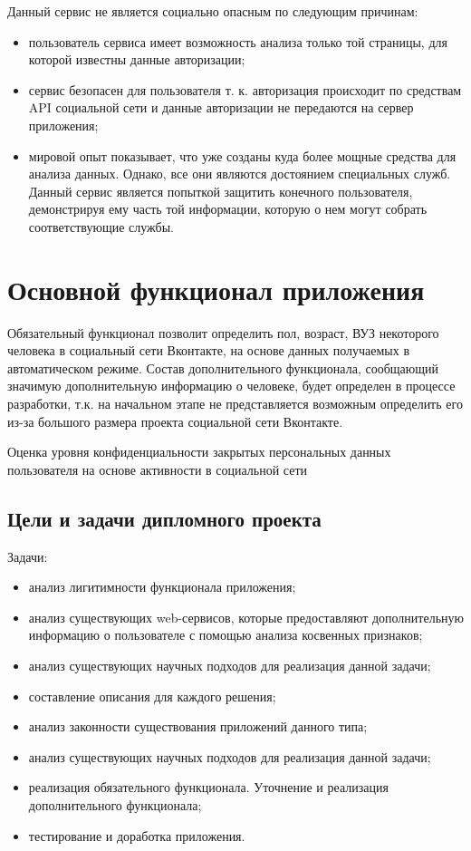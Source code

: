 \begin{chap1}
Данный сервис не является социально опасным по следующим причинам:
\begin{itemize}
\item пользователь сервиса имеет возможность анализа только той страницы, для которой известны данные авторизации;
\item сервис безопасен для пользователя т. к. авторизация происходит по средствам  API  социальной сети и данные авторизации не передаются на сервер приложения; 
\item мировой опыт показывает, что уже созданы куда более мощные средства для анализа данных. Однако, все они являются достоянием специальных служб. Данный сервис является попыткой защитить конечного пользователя, демонстрируя ему часть той информации, которую о нем могут собрать соответствующие службы.
\end{itemize}

\section{Основной функционал приложения}
Обязательный функционал позволит определить пол, возраст, ВУЗ некоторого человека в социальный сети Вконтакте, на основе данных получаемых в автоматическом режиме. Состав дополнительного функционала, сообщающий значимую дополнительную информацию о человеке,  будет определен в процессе разработки, т.к. на начальном этапе не представляется возможным определить его из-за большого размера проекта социальной сети Вконтакте.

Оценка уровня конфиденциальности закрытых персональных данных пользователя на основе активности в социальной сети

\subsection{Цели и задачи дипломного проекта}
Задачи:
	\begin{itemize}
\item анализ лигитимности функционала приложения;
\item анализ существующих web-сервисов, которые предоставляют дополнительную информацию о пользователе с помощью анализа косвенных признаков;
\item анализ существующих научных подходов для реализация данной задачи;
\item составление описания для каждого решения;
\item анализ законности существования приложений данного типа;
\item анализ существующих научных подходов для реализация данной задачи;
\item реализация обязательного функционала. Уточнение и реализация дополнительного функционала;
\item тестирование и доработка приложения.
	\end{itemize}
	

\end{chap1}
